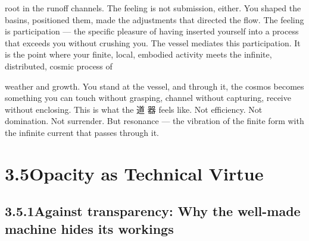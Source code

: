 root in the runoff channels. The feeling is not submission, either. You shaped the basins, positioned them, made the adjustments that directed the flow. The feeling is participation — the specific pleasure of having inserted yourself into a process that exceeds you without crushing you. The vessel mediates this participation. It is the point where your finite, local, embodied activity meets the infinite, distributed, cosmic process of

weather and growth. You stand at the vessel, and through it, the cosmos becomes something you can touch without grasping, channel without capturing, receive without enclosing. This is what the 道 器 feels like. Not efficiency. Not domination. Not surrender. But resonance — the vibration of the finite form with the infinite current that passes through it.

\section{3.5\quad Opacity as Technical Virtue}

\subsection{3.5.1\quad Against transparency: Why the well-made machine hides its workings}


